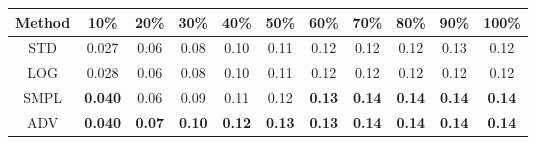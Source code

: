 \documentclass{standalone}
\begin{document}
\begin{tabular}{c|cccccccccc}
      \toprule
      Method & 10\% & 20\% & 30\% & 40\% & 50\% & 60\% & 70\% & 80\% & 90\% & 100\% \\
      \midrule
STD & 0.027 & 0.06 & 0.08 & 0.10 & 0.11 & 0.12 & 0.12 & 0.12 & 0.13 & 0.12\\
LOG & 0.028 & 0.06 & 0.08 & 0.10 & 0.11 & 0.12 & 0.12 & 0.12 & 0.12 & 0.12\\
SMPL & \textbf{0.040} & 0.06 & 0.09 & 0.11 & 0.12 & \textbf{0.13} & \textbf{0.14} & \textbf{0.14} & \textbf{0.14} & \textbf{0.14}\\
ADV & \textbf{0.040} & \textbf{0.07} & \textbf{0.10} & \textbf{0.12} & \textbf{0.13} & \textbf{0.13} & \textbf{0.14} & \textbf{0.14} & \textbf{0.14} & \textbf{0.14}\\
  \bottomrule
\end{tabular}
\end{document}
